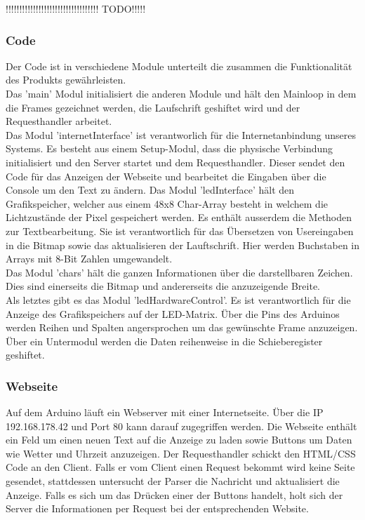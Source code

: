 \documentclass[10pt,a4paper]{article}
\begin{document}
!!!!!!!!!!!!!!!!!!!!!!!!!!!!!!!!!! TODO!!!!!\\

\subsubsection{Code}

Der Code ist in verschiedene Module unterteilt die zusammen die Funktionalität des Produkts gewährleisten.\\
Das 'main' Modul initialisiert die anderen Module und hält den Mainloop in dem die Frames gezeichnet werden, die Laufschrift geshiftet wird und der Requesthandler arbeitet.\\
Das Modul 'internetInterface' ist verantworlich für die Internetanbindung unseres Systems. Es besteht aus einem Setup-Modul, dass die physische Verbindung initialisiert und den Server startet und dem Requesthandler. Dieser sendet den Code für das Anzeigen der Webseite und bearbeitet die Eingaben über die Console um den Text zu ändern. 
Das Modul 'ledInterface' hält den Grafikspeicher, welcher aus einem 48x8 Char-Array besteht in welchem die Lichtzustände der Pixel gespeichert werden. Es enthält ausserdem die Methoden zur Textbearbeitung. Sie ist verantwortlich für das Übersetzen von Usereingaben in die Bitmap sowie das aktualisieren der Lauftschrift. Hier werden Buchstaben in Arrays mit 8-Bit Zahlen umgewandelt.\\
Das Modul 'chars' hält die ganzen Informationen über die darstellbaren Zeichen. Dies sind einerseits die Bitmap und andererseits die anzuzeigende Breite.\\
Als letztes gibt es das Modul 'ledHardwareControl'. Es ist verantwortlich für die Anzeige des Grafikspeichers auf der LED-Matrix. Über die Pins des Arduinos werden Reihen und Spalten angersprochen um das gewünschte Frame anzuzeigen. Über ein Untermodul werden die Daten reihenweise in die Schieberegister geshiftet.\\

\subsubsection{Webseite}

Auf dem Arduino läuft ein Webserver mit einer Internetseite. Über die IP 192.168.178.42 und Port 80 kann darauf zugegriffen werden. Die Webseite enthält ein Feld um einen neuen Text auf die Anzeige zu laden sowie Buttons um Daten wie Wetter und Uhrzeit anzuzeigen. Der Requesthandler schickt den HTML/CSS Code an den Client. Falls er vom Client einen Request bekommt wird keine Seite gesendet, stattdessen untersucht der Parser die Nachricht und aktualisiert die Anzeige. Falls es sich um das Drücken einer der Buttons handelt, holt sich der Server die Informationen per Request bei der entsprechenden Website. \\
\end{document}
